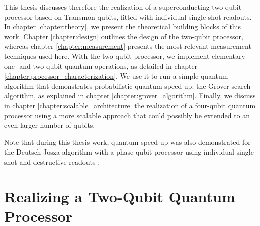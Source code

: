 \smallskip

This thesis discusses therefore the realization of
a superconducting two-qubit processor based on Transmon qubits, fitted
with individual single-shot readouts. In chapter \ref{chapter:theory}, we present the theoretical building blocks of this work. Chapter \ref{chapter:design} outlines the design of the two-qubit processor, whereas chapter \ref{chapter:measurement} presents the most relevant measurement techniques used here. With the two-qubit processor, we implement
elementary one- and two-qubit quantum operations, as detailed in chapter \ref{chapter:processor_characterization}. We use it to run
a simple quantum algorithm that demonstrates probabilistic quantum
speed-up: the Grover search algorithm, as explained in chapter \ref{chapter:grover_algorithm}. Finally, we discuss in chapter \ref{chapter:scalable_architecture} the realization of a four-qubit quantum processor using a more scalable approach that
could possibly be extended to an even larger number of qubits.

Note that during this thesis work, quantum speed-up
was also demonstrated for the Deutsch-Josza algorithm with a phase
qubit processor using individual single-shot and destructive readouts
\citep{yamamoto_quantum_2010}.


\section{Realizing a Two-Qubit Quantum Processor}

